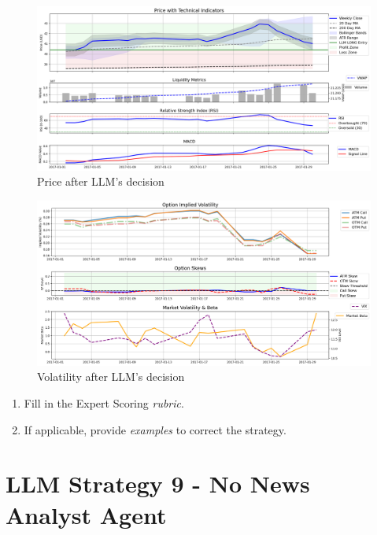 \documentclass[8pt]{scrartcl}
\begin{document}
\begin{figure}[H]
    \centering
    \includegraphics[width=1\linewidth]{judge_reviews/GOOGL_M_gpt-4o-mini/2017-01-01/llm_Price_with_Technical_Indicators.png}
    \caption{Price after LLM's decision}
\end{figure}

\begin{figure}[H]
    \centering
    \includegraphics[width=1\linewidth]{judge_reviews/GOOGL_M_gpt-4o-mini/2017-01-01/llm_Market_Volatility_&_Beta.png}
    \caption{Volatility after LLM's decision}
\end{figure}

\begin{tcolorbox}[colback=blue!10, colframe=blue!60, title=\textbf{TASKS}, sharp corners=southwest]
\begin{enumerate}
    \item Fill in the Expert Scoring \textit{rubric}.
    \item If applicable, provide \textit{examples} to correct the strategy.
\end{enumerate}
\end{tcolorbox}
\newpage


\section*{LLM Strategy 9 - No News Analyst Agent}
\label{app:s9}
\end{document}
